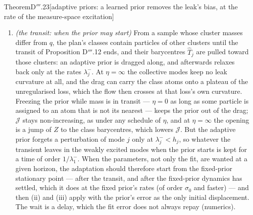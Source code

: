 \begin{thm}{Theorem}{D$'''$.23}[adaptive priors: a learned prior removes the leak's bias, at the rate of the
measure-space excitation]
\begin{enumerate}[label=\textup{(\roman*)}]
    D$'''$.18: the ball reaches the per-particle distance $(1 + q_{\min}^{-1/2})\rho$ and the prior's offsets
    $\norm{\zeta_k}_{\Ginv}\le\rho(\eta/(\sigma_0q_k))^{1/2}$, and the plan stays diagonal while both are within the
    margin. At $\eta = \infty$ the prior is the class barycentres ($\zeta = \bar u$), the norm is Theorem
    D$'''$.18's, $\lambda_0 = \min\{\sigma_0,h_1\}$, and the margin term is
    $\mathrm{margin}/(C(1 + 2q_{\min}^{-1/2}))$; for large finite $\eta$ the bound degenerates like $\eta^{-1/2}$,
    because this norm does not use the prior's relaxation onto the class means at the rate $\eta$ (a singular
    perturbation). As $\eta\to0$, $\lambda_1^- < \eta$ and the rate and the radius vanish with it; at $\eta = 0$ the
    prior is a parameter, and the statement is Theorem D$'''$.18's contraction for the fixed prior.
  \item \emph{(the transit: when the prior may start)} From a sample whose cluster masses differ from $q$, the plan's
    classes contain particles of other clusters until the transit of Proposition D$'''$.12 ends, and their
    barycentres $\hat T_j$ are pulled toward those clusters: an adaptive prior is dragged along, and afterwards
    relaxes back only at the rates $\lambda_j^-$. At $\eta = \infty$ the collective modes keep no leak curvature at
    all, and the drag can carry the class atoms onto a plateau of the unregularised loss, which the flow then crosses
    at that loss's own curvature. Freezing the prior while mass is in transit --- $\eta = 0$ as long as some particle
    is assigned to an atom that is not its nearest --- keeps the prior out of the drag; $\mathcal{J}$ stays
    non-increasing, as under any schedule of $\eta$, and at $\eta = \infty$ the opening is a jump of $Z$ to the class
    barycentres, which lowers $\mathcal{J}$. But the adaptive prior forgets a perturbation of mode $j$ only at
    $\lambda_j^- < h_j$, so whatever the transient leaves in the weakly excited modes when the prior starts is kept
    for a time of order $1/\lambda_1^-$. When the parameters, not only the fit, are wanted at a given horizon, the
    adaptation should therefore start from the fixed-prior stationary point --- after the transit, and after the
    fixed-prior dynamics has settled, which it does at the fixed prior's rates (of order $\sigma_0$ and faster) ---
    and then (ii) and (iii) apply with the prior's error as the only initial displacement. The wait is a delay, which
    the fit error does not always repay (numerics).
\end{enumerate}
\end{thm}

